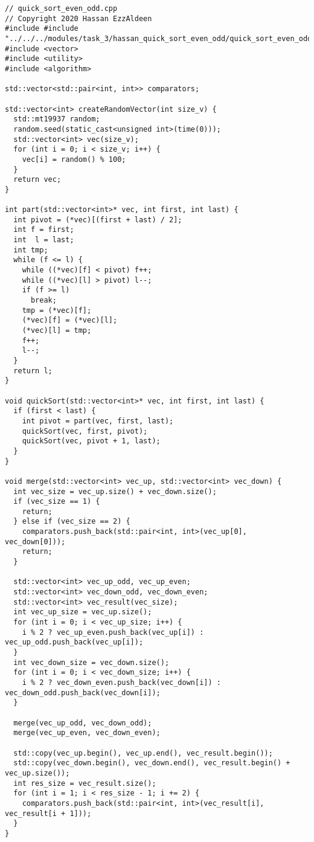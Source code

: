 \documentclass[a4paper]{report}
\begin{document}
\begin{lstlisting}
// quick_sort_even_odd.cpp
// Copyright 2020 Hassan EzzAldeen
#include #include "../../../modules/task_3/hassan_quick_sort_even_odd/quick_sort_even_odd.h"
#include <vector>
#include <utility>
#include <algorithm>

std::vector<std::pair<int, int>> comparators;

std::vector<int> createRandomVector(int size_v) {
  std::mt19937 random;
  random.seed(static_cast<unsigned int>(time(0)));
  std::vector<int> vec(size_v);
  for (int i = 0; i < size_v; i++) {
    vec[i] = random() % 100;
  }
  return vec;
}

int part(std::vector<int>* vec, int first, int last) {
  int pivot = (*vec)[(first + last) / 2];
  int f = first;
  int  l = last;
  int tmp;
  while (f <= l) {
    while ((*vec)[f] < pivot) f++;
    while ((*vec)[l] > pivot) l--;
    if (f >= l)
      break;
    tmp = (*vec)[f];
    (*vec)[f] = (*vec)[l];
    (*vec)[l] = tmp;
    f++;
    l--;
  }
  return l;
}

void quickSort(std::vector<int>* vec, int first, int last) {
  if (first < last) {
    int pivot = part(vec, first, last);
    quickSort(vec, first, pivot);
    quickSort(vec, pivot + 1, last);
  }
}

void merge(std::vector<int> vec_up, std::vector<int> vec_down) {
  int vec_size = vec_up.size() + vec_down.size();
  if (vec_size == 1) {
    return;
  } else if (vec_size == 2) {
    comparators.push_back(std::pair<int, int>(vec_up[0], vec_down[0]));
    return;
  }

  std::vector<int> vec_up_odd, vec_up_even;
  std::vector<int> vec_down_odd, vec_down_even;
  std::vector<int> vec_result(vec_size);
  int vec_up_size = vec_up.size();
  for (int i = 0; i < vec_up_size; i++) {
    i % 2 ? vec_up_even.push_back(vec_up[i]) : vec_up_odd.push_back(vec_up[i]);
  }
  int vec_down_size = vec_down.size();
  for (int i = 0; i < vec_down_size; i++) {
    i % 2 ? vec_down_even.push_back(vec_down[i]) : vec_down_odd.push_back(vec_down[i]);
  }

  merge(vec_up_odd, vec_down_odd);
  merge(vec_up_even, vec_down_even);

  std::copy(vec_up.begin(), vec_up.end(), vec_result.begin());
  std::copy(vec_down.begin(), vec_down.end(), vec_result.begin() + vec_up.size());
  int res_size = vec_result.size();
  for (int i = 1; i < res_size - 1; i += 2) {
    comparators.push_back(std::pair<int, int>(vec_result[i], vec_result[i + 1]));
  }
}


\end{lstlisting}
\end{document}
